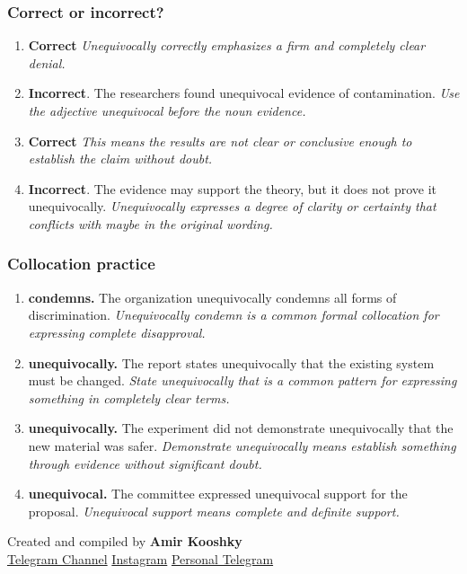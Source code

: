 \documentclass[11pt]{article}
\begin{document}
\subsubsection{Correct or incorrect?}
\begin{enumerate}
  \item \textbf{Correct} \emph{Unequivocally correctly emphasizes a firm and completely clear denial.}
  \item \textbf{Incorrect}. The researchers found unequivocal evidence of contamination. \emph{Use the adjective unequivocal before the noun evidence.}
  \item \textbf{Correct} \emph{This means the results are not clear or conclusive enough to establish the claim without doubt.}
  \item \textbf{Incorrect}. The evidence may support the theory, but it does not prove it unequivocally. \emph{Unequivocally expresses a degree of clarity or certainty that conflicts with maybe in the original wording.}
\end{enumerate}

\subsubsection{Collocation practice}
\begin{enumerate}
  \item \textbf{condemns.} The organization unequivocally condemns all forms of discrimination. \emph{Unequivocally condemn is a common formal collocation for expressing complete disapproval.}
  \item \textbf{unequivocally.} The report states unequivocally that the existing system must be changed. \emph{State unequivocally that is a common pattern for expressing something in completely clear terms.}
  \item \textbf{unequivocally.} The experiment did not demonstrate unequivocally that the new material was safer. \emph{Demonstrate unequivocally means establish something through evidence without significant doubt.}
  \item \textbf{unequivocal.} The committee expressed unequivocal support for the proposal. \emph{Unequivocal support means complete and definite support.}
\end{enumerate}

\vfill
\begin{center}
\small\color{Muted} Created and compiled by \textbf{Amir Kooshky}\\
\href{https://t.me/KooshkyTOEFL}{Telegram Channel}\quad\textbullet\quad
\href{https://www.instagram.com/kooshkytoefl}{Instagram}\quad\textbullet\quad
\href{https://t.me/KooshkyTOEFL\_pv}{Personal Telegram}
\end{center}
\end{document}
